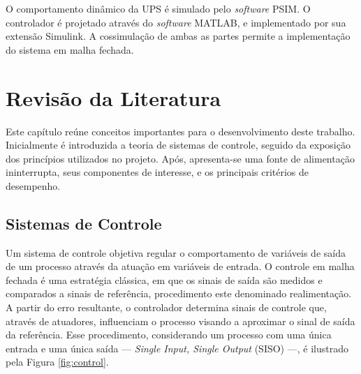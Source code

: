 \documentclass[repeatfields,oneside,overleaf]{tcc}
\begin{document}
O comportamento dinâmico da UPS é simulado pelo \textit{software} PSIM.
O controlador é projetado através do \textit{software} MATLAB, e implementado por sua extensão Simulink.
A cossimulação de ambas as partes permite a implementação do sistema em malha fechada.







\chapter{Revisão da Literatura}\label{sec:revisao}

Este capítulo reúne conceitos importantes para o desenvolvimento deste trabalho.
Inicialmente é introduzida a teoria de sistemas de controle, seguido da exposição dos princípios utilizados no projeto.
Após, apresenta-se uma fonte de alimentação ininterrupta, seus componentes de interesse, e os principais critérios de desempenho.

\section{Sistemas de Controle}\label{sec:controle}

Um sistema de controle objetiva regular o comportamento de variáveis de saída de um processo através da atuação em variáveis de entrada.
O controle em malha fechada é uma estratégia clássica, em que os sinais de saída são medidos e comparados a sinais de referência, procedimento este denominado realimentação.
A partir do erro resultante, o controlador determina sinais de controle que, através de atuadores, influenciam o processo visando a aproximar o sinal de saída da referência.
Esse procedimento, considerando um processo com uma única entrada e uma única saída --- \textit{Single Input, Single Output} (SISO) ---, é ilustrado pela Figura \ref{fig:control}.
\end{document}
